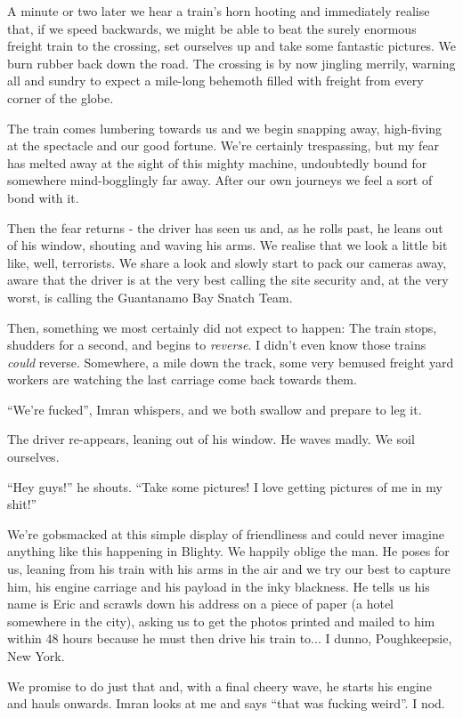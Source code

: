 \documentclass[a5paper,titlepage,11pt]{book}
\begin{document}
A minute or two later we hear a train's horn hooting and immediately realise that, if we speed backwards, we might be able to beat the surely enormous freight train to the crossing, set ourselves up and take some fantastic pictures.  We burn rubber back down the road.  The crossing is by now jingling merrily, warning all and sundry to expect a mile-long behemoth filled with freight from every corner of the globe.

The train comes lumbering towards us and we begin snapping away, high-fiving at the spectacle and our good fortune.  We're certainly trespassing, but my fear has melted away at the sight of this mighty machine, undoubtedly bound for somewhere mind-bogglingly far away.  After our own journeys we feel a sort of bond with it.

Then the fear returns - the driver has seen us and, as he rolls past, he leans out of his window, shouting and waving his arms.  We realise that we look a little bit like, well, terrorists.  We share a look and slowly start to pack our cameras away, aware that the driver is at the very best calling the site security and, at the very worst, is calling the Guantanamo Bay Snatch Team.

Then, something we most certainly did not expect to happen:  The train stops, shudders for a second, and begins to \emph{reverse}.  I didn't even know those trains \emph{could} reverse.  Somewhere, a mile down the track, some very bemused freight yard workers are watching the last carriage come back towards them.

``We're fucked'', Imran whispers, and we both swallow and prepare to leg it.

The driver re-appears, leaning out of his window.  He waves madly.  We soil ourselves.

``Hey guys!'' he shouts.  ``Take some pictures!  I love getting pictures of me in my shit!''

We're gobsmacked at this simple display of friendliness and could never imagine anything like this happening in Blighty.  We happily oblige the man.  He poses for us, leaning from his train with his arms in the air and we try our best to capture him, his engine carriage and his payload in the inky blackness.  He tells us his name is Eric and scrawls down his address on a piece of paper (a hotel somewhere in the city), asking us to get the photos printed and mailed to him within 48 hours because he must then drive his train to... I dunno, Poughkeepsie, New York.

We promise to do just that and, with a final cheery wave, he starts his engine and hauls onwards.  Imran looks at me and says ``that was fucking weird''.  I nod.
\end{document}
